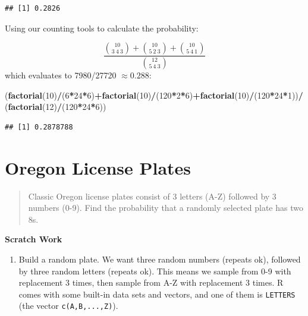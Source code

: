 \documentclass[
]{book}
\newenvironment{Shaded}{\begin{snugshade}}{\end{snugshade}}
\newcommand{\DecValTok}[1]{\textcolor[rgb]{0.00,0.00,0.81}{#1}}
\newcommand{\FunctionTok}[1]{\textcolor[rgb]{0.13,0.29,0.53}{\textbf{#1}}}
\newcommand{\NormalTok}[1]{#1}
\newcommand{\SpecialCharTok}[1]{\textcolor[rgb]{0.81,0.36,0.00}{\textbf{#1}}}
\providecommand{\tightlist}{%
  \setlength{\itemsep}{0pt}\setlength{\parskip}{0pt}}
\theoremstyle{definition}
\theoremstyle{definition}
\theoremstyle{definition}
\theoremstyle{definition}
\theoremstyle{remark}
\begin{document}
\begin{verbatim}
## [1] 0.2826
\end{verbatim}

Using our counting tools to calculate the probability:

\[\frac{\binom{10}{3~4~3}+\binom{10}{5~2~3}+\binom{10}{5~4~1}}{\binom{12}{5~4~3}}\]
which evaluates to 7980/27720 \(\approx 0.288\):

\begin{Shaded}
\begin{Highlighting}[]
\NormalTok{(}\FunctionTok{factorial}\NormalTok{(}\DecValTok{10}\NormalTok{)}\SpecialCharTok{/}\NormalTok{(}\DecValTok{6}\SpecialCharTok{*}\DecValTok{24}\SpecialCharTok{*}\DecValTok{6}\NormalTok{)}\SpecialCharTok{+}\FunctionTok{factorial}\NormalTok{(}\DecValTok{10}\NormalTok{)}\SpecialCharTok{/}\NormalTok{(}\DecValTok{120}\SpecialCharTok{*}\DecValTok{2}\SpecialCharTok{*}\DecValTok{6}\NormalTok{)}\SpecialCharTok{+}\FunctionTok{factorial}\NormalTok{(}\DecValTok{10}\NormalTok{)}\SpecialCharTok{/}\NormalTok{(}\DecValTok{120}\SpecialCharTok{*}\DecValTok{24}\SpecialCharTok{*}\DecValTok{1}\NormalTok{))}\SpecialCharTok{/}\NormalTok{(}\FunctionTok{factorial}\NormalTok{(}\DecValTok{12}\NormalTok{)}\SpecialCharTok{/}\NormalTok{(}\DecValTok{120}\SpecialCharTok{*}\DecValTok{24}\SpecialCharTok{*}\DecValTok{6}\NormalTok{))}
\end{Highlighting}
\end{Shaded}

\begin{verbatim}
## [1] 0.2878788
\end{verbatim}

\section{Oregon License Plates}\label{license-plates-R}

\begin{quote}
Classic Oregon license plates consist of 3 letters (A-Z) followed by 3 numbers (0-9). Find the probability that a randomly selected plate has two 8s.
\end{quote}

\textbf{Scratch Work}

\begin{enumerate}
\def\labelenumi{\arabic{enumi}.}
\tightlist
\item
  Build a random plate. We want three random numbers (repeats ok), followed by three random letters (repeats ok). This means we sample from 0-9 with replacement 3 times, then sample from A-Z with replacement 3 times. R comes with some built-in data sets and vectors, and one of them is \texttt{LETTERS} (the vector \texttt{c(\textquotesingle{}A\textquotesingle{},\textquotesingle{}B\textquotesingle{},...,\textquotesingle{}Z\textquotesingle{})}).
\end{enumerate}
\end{document}
